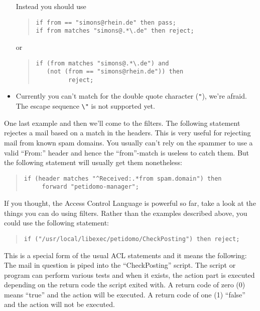 \documentclass[a4paper,11pt]{scrreprt}
\begin{document}
\begin{itemize}
Instead you should use
\begin{quote}
\begin{verbatim}
if from == "simons@rhein.de" then pass;
if from matches "simons@.*\.de" then reject;
\end{verbatim}
\end{quote}
or
\begin{quote}
\begin{verbatim}
if (from matches "simons@.*\.de") and
   (not (from == "simons@rhein.de")) then
         reject;
\end{verbatim}
\end{quote}

\item Currently you can't match for the double quote character ({\texttt{"}}),
  we're afraid. The escape sequence \verb|\"| is not supported yet.

\end{itemize}

One last example and then we'll come to the filters. The following
statement rejectes a mail based on a match in the headers. This is
very useful for rejecting mail from known spam domains. You usually
can't rely on the spammer to use a valid ``From:'' header and hence
the ``from''-match is useless to catch them. But the following
statement will usually get them nonetheless:
\begin{quote}
\begin{verbatim}
if (header matches "^Received:.*from spam.domain") then
     forward "petidomo-manager";
\end{verbatim}
\end{quote}

If you thought, the Access Control Language is powerful so far, take a
look at the things you can do using filters. Rather than the examples
described above, you could use the following statement:
\begin{quote}
\begin{verbatim}
if ("/usr/local/libexec/petidomo/CheckPosting") then reject;
\end{verbatim}
\end{quote}

This is a special form of the usual ACL statements and it means the
following: The mail in question is piped into the ``CheckPosting''
script. The script or program can perform various tests and when it
exists, the action part is executed depending on the return code the
script exited with. A return code of zero (0) means ``true'' and the
action will be executed. A return code of one (1) ``false'' and the
action will not be executed.
\end{document}
